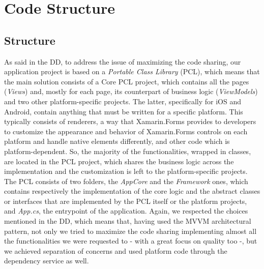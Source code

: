 \chapter{Code Structure}
\label{cha:structure}
\section{Structure}
As said in the DD, to address the issue of maximizing the code sharing, our application project is based on a \textit{Portable Class Library} (PCL), which means that the main solution consists of a Core PCL project, which contains all the pages (\textit{Views}) and, mostly for each page, its counterpart of business logic (\textit{ViewModels}) and two other platform-specific projects. The latter, specifically for iOS and Android, contain anything that must be written for a specific platform. This typically consists of renderers, a way that Xamarin.Forms provides to developers to customize the appearance and behavior of Xamarin.Forms controls on each platform and handle native elements differently, and other code which is platform-dependent. So, the majority of the functionalities, wrapped in classes, are located in the PCL project, which shares the business logic across the implementation and the customization is left to the platform-specific projects. \\

The PCL consists of two folders, the \textit{AppCore} and the \textit{Framework} ones, which contains respectively the implementation of the core logic and the abstract classes or interfaces that are implemented by the PCL itself or the platform projects, and \textit{App.cs}, the entrypoint of the application. Again, we respected the choices mentioned in the DD, which means that, having used the MVVM architectural pattern, not only we tried to maximize the code sharing implementing almost all the functionalities we were requested to - with a great focus on quality too -, but we achieved separation of concerns and used platform code through the dependency service as well. \\

